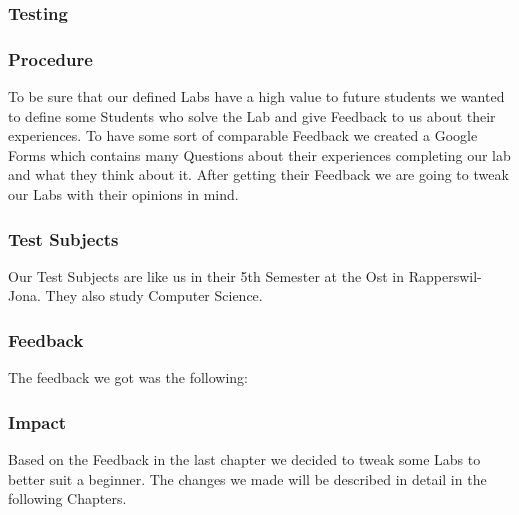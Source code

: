\subsubsection{Testing}
\subsubsection{Procedure}
To be sure that our defined Labs have a high value to future students we wanted to define some Students who solve the Lab and give Feedback to us about their experiences. To have some sort of comparable Feedback we created a Google Forms which contains many Questions about their experiences completing our lab and what they think about it. After getting their Feedback we are going to tweak our Labs with their opinions in mind.

\subsubsection{Test Subjects}
Our Test Subjects are like us in their 5th Semester at the Ost in Rapperswil-Jona. They also study Computer Science.

\subsubsection{Feedback}
The feedback we got was the following:

\subsubsection{Impact}
Based on the Feedback in the last chapter we decided to tweak some Labs to better suit a beginner. The changes we made will be described in detail in the following Chapters.
